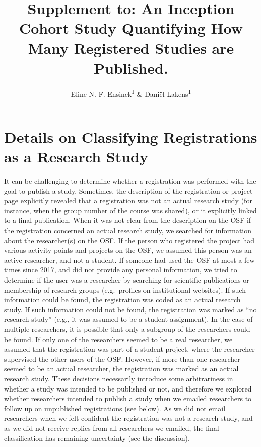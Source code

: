 \documentclass[
  ,jou, a4paper,floatsintext]{apa6}
\title{Supplement to: An Inception Cohort Study Quantifying How Many Registered Studies are Published.}
\author{Eline N. F. Ensinck\textsuperscript{1} \& Daniël Lakens\textsuperscript{1}}
\date{}
\affiliation{\vspace{0.5cm}\textsuperscript{1} Eindhoven University of Technology}
\begin{document}
\maketitle

\section{Details on Classifying Registrations as a Research Study}\label{details-on-classifying-registrations-as-a-research-study}

It can be challenging to determine whether a registration was performed with the goal to publish a study. Sometimes, the description of the registration or project page explicitly revealed that a registration was not an actual research study (for instance, when the group number of the course was shared), or it explicitly linked to a final publication. When it was not clear from the description on the OSF if the registration concerned an actual research study, we searched for information about the researcher(s) on the OSF. If the person who registered the project had various activity points and projects on the OSF, we assumed this person was an active researcher, and not a student. If someone had used the OSF at most a few times since 2017, and did not provide any personal information, we tried to determine if the user was a researcher by searching for scientific publications or membership of research groups (e.g.~profiles on institutional websites). If such information could be found, the registration was coded as an actual research study. If such information could not be found, the registration was marked as ``no research study'' (e.g., it was assumed to be a student assignment). In the case of multiple researchers, it is possible that only a subgroup of the researchers could be found. If only one of the researchers seemed to be a real researcher, we assumed that the registration was part of a student project, where the researcher supervised the other users of the OSF. However, if more than one researcher seemed to be an actual researcher, the registration was marked as an actual research study. These decisions necessarily introduce some arbitrariness in whether a study was intended to be published or not, and therefore we explored whether researchers intended to publish a study when we emailed researchers to follow up on unpublished registrations (see below). As we did not email researchers when we felt confident the registration was not a research study, and as we did not receive replies from all researchers we emailed, the final classification has remaining uncertainty (see the discussion).
\end{document}
